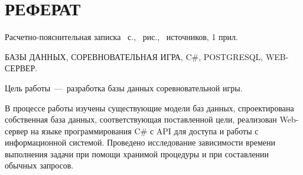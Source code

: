\chapter*{РЕФЕРАТ}
Расчетно-пояснительная записка \pageref{LastPage}~с., ~рис., ~источников, 1 прил.

БАЗЫ ДАННЫХ, СОРЕВНОВАТЕЛЬНАЯ ИГРА, C\#, POSTGRESQL, WEB-СЕРВЕР.

Цель работы~---~разработка базы данных соревновательной игры.

В процессе работы изучены существующие модели баз данных, спроектирована собственная база данных, соответствующая поставленной цели, реализован Web-сервер на языке программирования C\# с API для доступа и работы с информационной системой. Проведено исследование зависимости времени выполнения задачи при помощи хранимой процедуры и при составлении обычных запросов.
